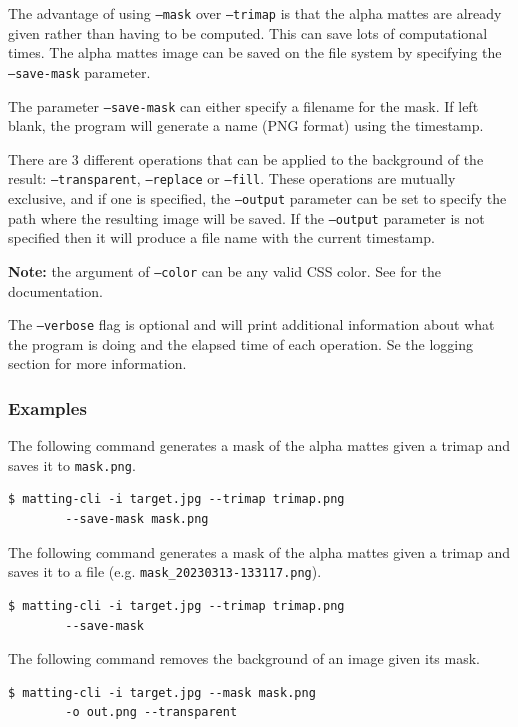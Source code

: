 \documentclass[a4paper]{article}
\begin{document}
The advantage of using \texttt{--mask} over
\texttt{--trimap} is that the alpha mattes are
already given rather than having to be computed.
This can save lots of computational times.
The alpha mattes image can be saved on the file system
by specifying the \texttt{--save-mask} parameter.

The parameter \texttt{--save-mask} can either specify a filename
for the mask. If left blank, the program will generate a name (\gls{PNG} format)
using the timestamp.

There are 3 different operations that can be applied
to the background of the result: \texttt{--transparent},
\texttt{--replace} or \texttt{--fill}.
These operations are mutually exclusive, and if one is specified,
the \texttt{--output} parameter can be set to
specify the path where the resulting image will be saved.
If the \texttt{--output} parameter is not specified then it will produce
a file name with the current timestamp.

\textbf{Note:} the argument of \texttt{--color} can be any valid
\gls{CSS} color. See \cite{csscolors} for the documentation.

The \texttt{--verbose} flag is optional and will print additional
information about what the program is doing and the elapsed
time of each operation. Se the logging section for more information.

\subsubsection{Examples}

The following command generates a mask of the alpha \gls{matte}s
given a \gls{trimap} and saves it to \texttt{mask.png}.
\begin{lstlisting}[style=boxed]
    $ matting-cli -i target.jpg --trimap trimap.png
        --save-mask mask.png
\end{lstlisting}

The following command generates a mask of the alpha mattes
given a \gls{trimap} and saves it to a file (e.g. \texttt{mask\_20230313-133117.png}).
\begin{lstlisting}[style=boxed]
    $ matting-cli -i target.jpg --trimap trimap.png
        --save-mask
\end{lstlisting}

The following command removes the background of an image
given its mask.
\begin{lstlisting}[style=boxed]
    $ matting-cli -i target.jpg --mask mask.png
        -o out.png --transparent
\end{lstlisting}
\end{document}

